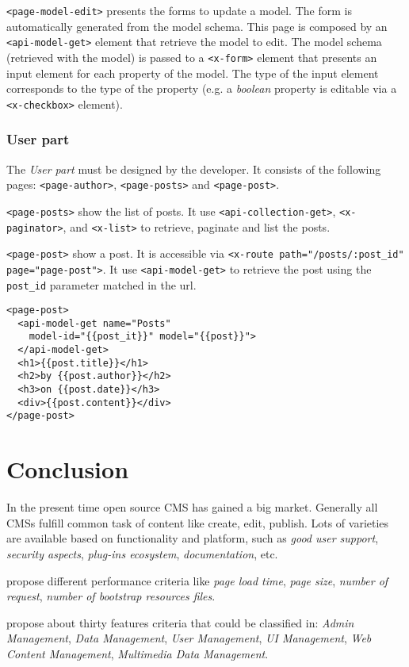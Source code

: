 \documentclass{sig-alternate}
\begin{document}
\vspace{0.2cm}

\texttt{<page-model-edit>} presents the forms to update a model.
The form is automatically generated from the model schema.
This page is composed by an \texttt{<api-model-get>} element that retrieve the model to edit. The model schema (retrieved with the model) is passed to a \texttt{<x-form>} element that presents an input element for each property of the model. The type of the input element corresponds to the type of the property (e.g. a \emph{boolean} property is editable via a \texttt{<x-checkbox>} element).

\subsubsection{User part}
The \emph{User part} must be designed by the developer.
It consists of the following pages: \texttt{<page-author>}, \texttt{<page-posts>} and \texttt{<page-post>}. 

\vspace{0.2cm}

\texttt{<page-posts>} show the list of posts. It use \texttt{<api-collection-get>}, \texttt{<x-paginator>}, and \texttt{<x-list>} to retrieve, paginate and list the posts.

\vspace{0.2cm}

\texttt{<page-post>} show a post. It is accessible via 
\texttt{<x-route path="/posts/:post\_id" page="page-post">}. It use \texttt{<api-model-get>} to retrieve the post using the \texttt{post\_id} parameter matched in the url.

\begin{lstlisting}[language=HTML5]
<page-post>
  <api-model-get name="Posts" 
    model-id="{{post_it}}" model="{{post}}">
  </api-model-get>
  <h1>{{post.title}}</h1>
  <h2>by {{post.author}}</h2>
  <h3>on {{post.date}}</h3>
  <div>{{post.content}}</div>
</page-post>
\end{lstlisting}

\section{Conclusion}

In the present time open source CMS has gained a big market. 
Generally all CMSs fulfill common task of content like create, edit, publish. 
Lots of varieties are available based on functionality and platform, such as \emph{good user support}, \emph{security aspects}, \emph{plug-ins ecosystem}, \emph{documentation}, etc.

\cite{6169111} propose different performance criteria like \emph{page load time}, \emph{page size}, \emph{number of request}, \emph{number of bootstrap resources files}.
 
\cite{5552271} propose about thirty features criteria that could be classified in: \emph{Admin Management}, \emph{Data Management}, \emph{User Management}, \emph{UI Management}, \emph{Web Content Management}, \emph{Multimedia Data Management}.



\end{document}
